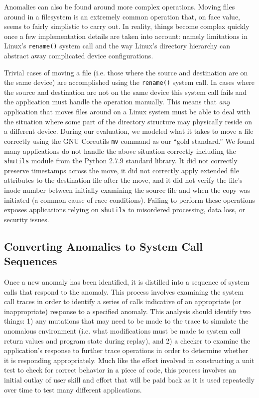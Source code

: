     Anomalies can also be found around more complex operations.  Moving files
    around in a filesystem is an extremely common operation that, on face value,
    seems to fairly simplistic to carry out.  In reality, things become complex
    quickly once a few implementation details are taken into account: namely
    limitations in Linux's {\tt rename()} system call and the way Linux's
    directory hierarchy can abstract away complicated device configurations.

    Trivial cases of moving a file (i.e. those where the source and destination
    are on the same device) are accomplished using the {\tt rename()} system
    call.  In cases where the source and destination are not on the same device
    this system call fails and the application must handle the operation
    manually. This means that \emph{any} application that moves files around on
    a Linux system must be able to deal with the situation where some part of
    the directory structure may physically reside on a different device.
    During our evaluation, we modeled what
    it takes to move a file correctly using the GNU Coreutils {\tt mv} command
    as our ``gold standard.''  We found many applications do not handle the
    above situation correctly including the {\tt shutils} module from the Python
    2.7.9 standard library.  It did not correctly preserve timestamps across the
    move, it did not correctly apply extended file attributes to the destination
    file after the move, and it did not verify the file's inode number between
    initially examining the source file and when the copy was initiated (a
    common cause of race conditions).  Failing to perform these operations
    exposes applications relying on {\tt shutils} to misordered processing, data
    loss, or security issues.

    \subsection{Converting Anomalies to System Call Sequences}

    Once a new anomaly has been identified, it is distilled into a sequence of
    system calls that respond to the anomaly.  This process
    involves examining the system call traces
    in order to
    identify a series of calls indicative of an appropriate (or inappropriate)
    response to a specified anomaly.
    This analysis should identify two things: 1) any mutations that may need to be
    made to the trace to simulate the anomalous environment (i.e. what
    modifications
    must be made to system call return values and program state during replay), and 2) a checker to
    examine the application's response to further trace operations in order to
    determine
    whether it is responding appropriately.
    Much like the effort involved in constructing a unit test to
    check for correct behavior in a piece of code, this
    process involves an initial outlay of user skill and effort that 
    will be paid back as it is used
    repeatedly over time to test many different applications.

